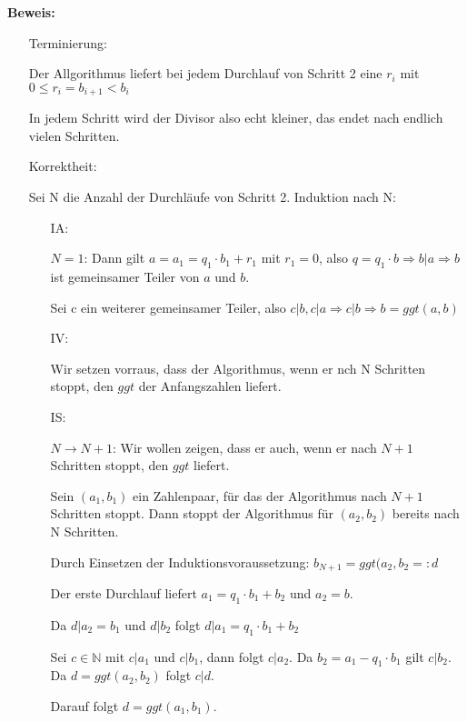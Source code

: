 \documentclass[pdftex,12pt,a4paper,fleqn]{scrartcl}
\begin{document}
\textbf{Beweis:}

\begin{itemize}
	\item[Terminierung:]

	Der Allgorithmus liefert bei jedem Durchlauf von Schritt 2 eine $r_i$ mit $0\leq r_i = b_{i+1} < b_i$

	In jedem Schritt wird der Divisor also echt kleiner, das endet nach endlich vielen Schritten.

	\item[Korrektheit:]

	Sei N die Anzahl der Durchläufe von Schritt 2. Induktion nach N:

	\begin{itemize}
		\item[IA:]

		$N = 1$: Dann gilt $a = a_1 = q_1 \cdot b_1 + r_1$ mit $r_1 = 0$, also $q = q_1 \cdot b \Rightarrow b | a \Rightarrow b$ ist gemeinsamer Teiler von $a$ und $b$. 

		Sei c ein weiterer gemeinsamer Teiler, also $c | b, c | a \Rightarrow c | b \Rightarrow b = ggt(a,b)$

		\item[IV:]

		Wir setzen vorraus, dass der Algorithmus, wenn er nch N Schritten stoppt, den $ggt$ der Anfangszahlen liefert.

		\item[IS:]

		$N \rightarrow N+1$: Wir wollen zeigen, dass er auch, wenn er nach $N+1$ Schritten stoppt, den $ggt$ liefert.

		Sein $(a_1,b_1)$ ein Zahlenpaar, für das der Algorithmus nach $N+1$ Schritten stoppt. Dann stoppt der Algorithmus für $(a_2,b_2)$ bereits nach N Schritten.

		Durch Einsetzen der Induktionsvoraussetzung: $b_{N+1}=ggt(a_2,b_2 =: d$

		Der erste Durchlauf liefert $a_1 = q_1 \cdot b_1 + b_2$ und $a_2 = b$.

		Da $d | a_2 = b_1$ und $d | b_2$ folgt $d | a_1 = q_1 \cdot b_1 + b_2$

		Sei $c \in \mathbb{N}$ mit $c | a_1$ und $c | b_1$, dann folgt $c | a_2$. Da $b_2 = a_1 -q_1 \cdot b_1$ gilt $c | b_2$. Da $d = ggt(a_2,b_2)$ folgt $c | d$. 

		Darauf folgt $d = ggt(a_1,b_1)$.
	\end{itemize}
\end{itemize}
\end{document}
